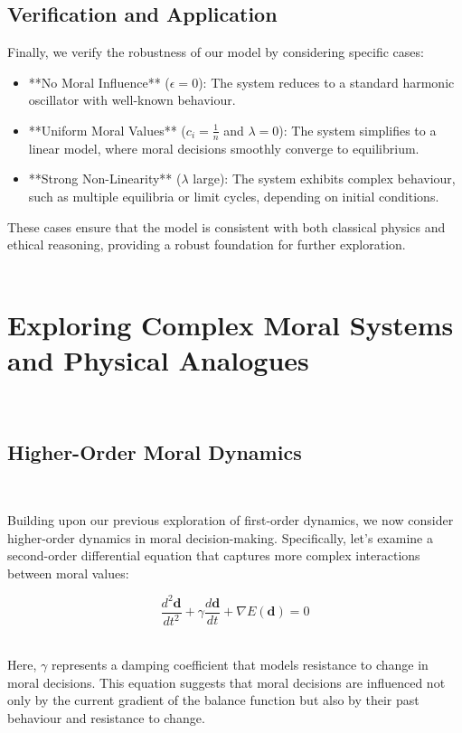 \documentclass{article}
\begin{document}
\subsection{Verification and Application}

Finally, we verify the robustness of our model by considering specific cases:

\begin{itemize}
  \item **No Moral Influence** (\( \epsilon = 0 \)): The system reduces to a standard harmonic oscillator with well-known behaviour.
  \item **Uniform Moral Values** (\( c_i = \frac{1}{n} \) and \( \lambda = 0 \)): The system simplifies to a linear model, where moral decisions smoothly converge to equilibrium.
  \item **Strong Non-Linearity** (\( \lambda \) large): The system exhibits complex behaviour, such as multiple equilibria or limit cycles, depending on initial conditions.
\end{itemize}

These cases ensure that the model is consistent with both classical physics and ethical reasoning, providing a robust foundation for further exploration.
\\
\\

\section{Exploring Complex Moral Systems and Physical Analogues}
\

\subsection{Higher-Order Moral Dynamics}
\

Building upon our previous exploration of first-order dynamics, we now consider higher-order dynamics in moral decision-making. Specifically, let's examine a second-order differential equation that captures more complex interactions between moral values:

\[
\frac{d^2\mathbf{d}}{dt^2} + \gamma \frac{d\mathbf{d}}{dt} + \nabla E(\mathbf{d}) = 0
\]
\

Here, \( \gamma \) represents a damping coefficient that models resistance to change in moral decisions. This equation suggests that moral decisions are influenced not only by the current gradient of the balance function but also by their past behaviour and resistance to change.
\\
\end{document}
